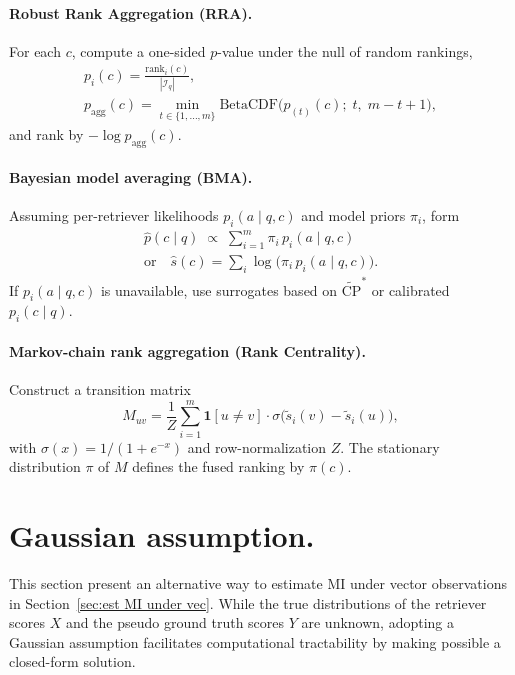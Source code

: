 \documentclass{article}
\theoremstyle{plain}
\theoremstyle{definition}
\theoremstyle{remark}
\begin{document}
\paragraph{Robust Rank Aggregation (RRA).}
For each $c$, compute a one-sided $p$-value under the null of random rankings,
\begin{multline}
p_i(c)=\frac{\mathrm{rank}_i(c)}{|\mathcal{I}_q|},\\
p_{\mathrm{agg}}(c)=\min_{t\in\{1,\dots,m\}} \mathrm{BetaCDF}\!\Big(p_{(t)}(c);\;t,\;m{-}t{+}1\Big),
\end{multline}
and rank by $- \log p_{\mathrm{agg}}(c)$.

\paragraph{Bayesian model averaging (BMA).}
Assuming per-retriever likelihoods $p_i(a\mid q,c)$ and model priors $\pi_i$, form
\begin{multline}
\hat{p}(c\mid q)\;\propto\;\sum_{i=1}^m \pi_i\, p_i(a\mid q,c)
\\ \text{or}\quad
\hat{s}(c)=\sum_i \log\big(\pi_i\, p_i(a\mid q,c)\big).
\end{multline}
If $p_i(a\mid q,c)$ is unavailable, use surrogates based on $\widetilde{\mathrm{CP}}^\ast$ or calibrated $p_i(c\mid q)$.

\paragraph{Markov-chain rank aggregation (Rank Centrality).}
Construct a transition matrix
\begin{equation}
M_{uv}=\frac{1}{Z}\sum_{i=1}^m \mathbf{1}[u\neq v]\cdot \sigma\!\big(\tilde{s}_i(v)-\tilde{s}_i(u)\big),
\end{equation}
with $\sigma(x)=1/(1+e^{-x})$ and row-normalization $Z$. The stationary distribution $\pi$ of $M$ defines the fused ranking by $\pi(c)$.






\section{Gaussian assumption.}
\label{appendix:gaussian assumption}

This section present an alternative way to estimate MI under vector observations in Section~\ref{sec:est MI under vec}. While the true distributions of the retriever scores $X$ and the pseudo ground truth scores $Y$ are unknown, adopting a Gaussian assumption facilitates computational tractability by making possible a closed-form solution.
\end{document}
